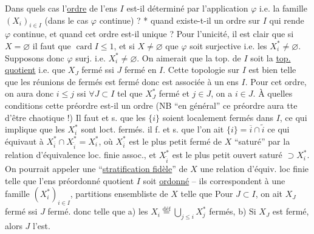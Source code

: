 Dans quels cas l'\uline{ordre} de l'ens $I$ est-il déterminé
par l'application $\varphi$ i.e. la famille $(X_i)_{i\in I}$ (dans le
cas $\varphi$ continue) ? * 
quand  existe-t-il un ordre sur $I$ qui rende $\varphi$
continue, et quand cet ordre est-il unique ?
Pour l'unicité, il est clair que si $X=\varnothing$ il
faut que $\operatorname{card}I\leq1$, et si $X\ne\varnothing$ que $\varphi$ soit
surjective i.e. les $X_i^*\ne\varnothing$. Supposons donc $\varphi$ surj. i.e.
$X_i^*\ne\varnothing$. On aimerait que la top. de $I$ soit la \uline{top.}
\uline{quotient} i.e. que $X_J$ fermé ssi $J$ fermé en $I$.
Cette topologie sur $I$ est bien telle que les réunions
de fermés est fermé  donc est associée à un ens
 $I$. Pour cet ordre, on aura donc
$i\leq j$ ssi  $\forall J\subset I$ tel que $X_J^*$ fermé et $j\in J$, on
a $i\in J$. À quelles conditions cette préordre est-il
un ordre (NB ``en général'' ce préordre aura tte
 d'être chaotique !) Il faut et s. que
les $\{i\}$ soient localement fermés dans $I$, ce
qui implique que les $X_i^*$ sont loct. fermés. 
 il f. et s. que  l'on ait 
$\{i\}=\overline i\cap\widetilde i$ ce qui équivaut à 
$X_{\overline i}^*\cap X_{\widetilde i}^*=X_i^*$,
où $X_{\overline i}^*$ est le plus petit fermé de $X$  ``saturé'' par la
relation d'équivalence loc. finie assoc., et $X_{\widetilde i}^*$ est le
plus petit ouvert saturé $\supset X_i^*$. On pourrait appeler
une ``\uline{stratification fidèle}'' de $X$ une relation d'équiv.
loc finie telle que l'ens préordonné quotient
$I$ soit \uline{ordonné} -- ils correspondent à une famille
$(X_i^*)_{i\in I}$, partitions ensembliste de $X$ 
 
 telle que
Pour $J\subset I$, on ait $X_J$ fermé ssi $J$ fermé.
donc telle que a) les $X_i\overset{\mathrm{déf}}=\bigcup_{j\leq i}X_j^*$ fermés,
b) Si $X_J$ est fermé, alors $J$ l'est.
